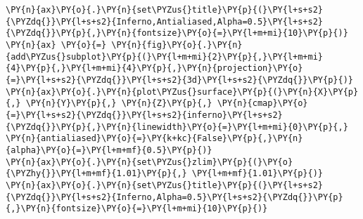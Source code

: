 \begin{tcolorbox}[breakable, size=fbox, boxrule=1pt, pad at break*=1mm,colback=cellbackground, colframe=cellborder]
\begin{Verbatim}[commandchars=\\\{\}]
\PY{n}{ax}\PY{o}{.}\PY{n}{set\PYZus{}title}\PY{p}{(}\PY{l+s+s2}{\PYZdq{}}\PY{l+s+s2}{Inferno,Antialiased,Alpha=0.5}\PY{l+s+s2}{\PYZdq{}}\PY{p}{,}\PY{n}{fontsize}\PY{o}{=}\PY{l+m+mi}{10}\PY{p}{)}
\PY{n}{ax} \PY{o}{=} \PY{n}{fig}\PY{o}{.}\PY{n}{add\PYZus{}subplot}\PY{p}{(}\PY{l+m+mi}{2}\PY{p}{,}\PY{l+m+mi}{4}\PY{p}{,}\PY{l+m+mi}{4}\PY{p}{,}\PY{n}{projection}\PY{o}{=}\PY{l+s+s2}{\PYZdq{}}\PY{l+s+s2}{3d}\PY{l+s+s2}{\PYZdq{}}\PY{p}{)}
\PY{n}{ax}\PY{o}{.}\PY{n}{plot\PYZus{}surface}\PY{p}{(}\PY{n}{X}\PY{p}{,} \PY{n}{Y}\PY{p}{,} \PY{n}{Z}\PY{p}{,} \PY{n}{cmap}\PY{o}{=}\PY{l+s+s2}{\PYZdq{}}\PY{l+s+s2}{inferno}\PY{l+s+s2}{\PYZdq{}}\PY{p}{,}\PY{n}{linewidth}\PY{o}{=}\PY{l+m+mi}{0}\PY{p}{,} \PY{n}{antialiased}\PY{o}{=}\PY{k+kc}{False}\PY{p}{,}\PY{n}{alpha}\PY{o}{=}\PY{l+m+mf}{0.5}\PY{p}{)}
\PY{n}{ax}\PY{o}{.}\PY{n}{set\PYZus{}zlim}\PY{p}{(}\PY{o}{\PYZhy{}}\PY{l+m+mf}{1.01}\PY{p}{,} \PY{l+m+mf}{1.01}\PY{p}{)}
\PY{n}{ax}\PY{o}{.}\PY{n}{set\PYZus{}title}\PY{p}{(}\PY{l+s+s2}{\PYZdq{}}\PY{l+s+s2}{Inferno,Alpha=0.5}\PY{l+s+s2}{\PYZdq{}}\PY{p}{,}\PY{n}{fontsize}\PY{o}{=}\PY{l+m+mi}{10}\PY{p}{)}



\end{Verbatim}
\end{tcolorbox}
